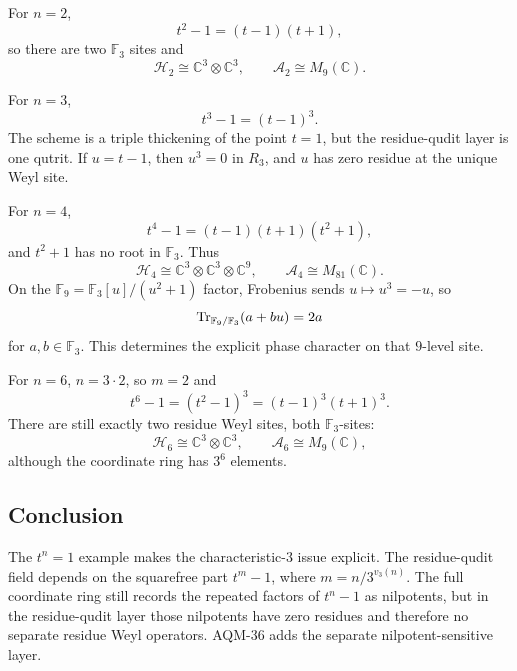For \(n=2\),
\[
  t^2-1=(t-1)(t+1),
\]
so there are two \(\mathbb F_3\) sites and
\[
  \mathcal H_2\cong\mathbb C^3\otimes\mathbb C^3,\qquad
  \mathcal A_2\cong M_9(\mathbb C).
\]

For \(n=3\),
\[
  t^3-1=(t-1)^3.
\]
The scheme is a triple thickening of the point \(t=1\), but the residue-qudit
layer is one qutrit.  If \(u=t-1\), then \(u^3=0\) in \(R_3\), and \(u\) has
zero residue at the unique Weyl site.

For \(n=4\),
\[
  t^4-1=(t-1)(t+1)(t^2+1),
\]
and \(t^2+1\) has no root in \(\mathbb F_3\).  Thus
\[
  \mathcal H_4\cong
  \mathbb C^3\otimes\mathbb C^3\otimes\mathbb C^9,\qquad
  \mathcal A_4\cong M_{81}(\mathbb C).
\]
On the \(\mathbb F_9=\mathbb F_3[u]/(u^2+1)\) factor, Frobenius sends
\(u\mapsto u^3=-u\), so
\[
  \operatorname{Tr}_{\mathbb F_9/\mathbb F_3}(a+bu)=2a
\]
for \(a,b\in\mathbb F_3\).  This determines the explicit phase character on
that \(9\)-level site.

For \(n=6\), \(n=3\cdot2\), so \(m=2\) and
\[
  t^6-1=(t^2-1)^3=(t-1)^3(t+1)^3.
\]
There are still exactly two residue Weyl sites, both \(\mathbb F_3\)-sites:
\[
  \mathcal H_6\cong\mathbb C^3\otimes\mathbb C^3,\qquad
  \mathcal A_6\cong M_9(\mathbb C),
\]
although the coordinate ring has \(3^6\) elements.

\subsection{Conclusion}

The \(t^n=1\) example makes the characteristic-\(3\) issue explicit.  The
residue-qudit field depends on the squarefree part \(t^m-1\), where
\(m=n/3^{v_3(n)}\).  The full coordinate ring still records the repeated
factors of \(t^n-1\) as nilpotents, but in the residue-qudit layer those
nilpotents have zero residues and therefore no separate residue Weyl
operators.  AQM-36 adds the separate nilpotent-sensitive layer.
